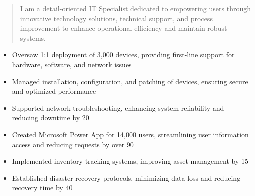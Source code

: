 



\makecvheader

\begin{quote}
  \noindent
  I am a detail-oriented IT Specialist dedicated to empowering users through innovative technology solutions, technical support, and process improvement to enhance operational efficiency and maintain robust systems.
\end{quote}

\par\smallskip
\noindent
\begin{minipage}{20cm}
  \begin{minipage}{9.75cm}
    \begin{itemize}
      \item Oversaw 1:1 deployment of 3,000 devices, providing first-line support for hardware, software, and network issues
      \item Managed installation, configuration, and patching of devices, ensuring secure and optimized performance
      \item Supported network troubleshooting, enhancing system reliability and reducing downtime by 20%
    \end{itemize}
  \end{minipage}
  \hfill
  \begin{minipage}{9.75cm}
    \begin{itemize}
      \item Created Microsoft Power App for 14,000 users, streamlining user information access and reducing requests by over 90%
      \item Implemented inventory tracking systems, improving asset management by 15%
      \item Established disaster recovery protocols, minimizing data loss and reducing recovery time by 40%
    \end{itemize}
  \end{minipage}
\end{minipage}
\par\smallskip
\divider

